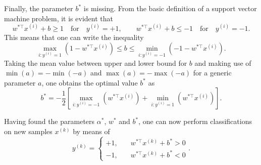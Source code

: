 \documentclass[a4paper,11pt]{article}
\numberwithin{equation}{section}
\begin{document}
{\begin{equation}
\end{equation} Finally, the parameter $b^*$ is missing. From the basic definition of a support vector machine problem, it is evident that \begin{equation}
w^{*\top}x^{(i)} + b \geq 1 \quad \text{for} \quad y^{(i)} = +1, \qquad w^{*\top}x^{(i)} + b \leq -1 \quad \text{for} \quad y^{(i)} = -1.
\end{equation} This means that one can write the inequality \begin{equation}
\max_{i:y^{(i)}=1}\left(1-w^{*\top}x^{(i)}\right) \leq b \leq \min_{i:y^{(i)}=-1}\left(-1-w^{*\top}x^{(i)}\right).
\end{equation} Taking the mean value between upper and lower bound for $b$ and making use of $\min(a) = -\min(-a)$ and $\max(a) = -\max(-a)$ for a generic parameter $a$, one obtains the optimal value $b^*$ as \begin{equation}
b^* = -\frac{1}{2}\left[\max_{i:y^{(i)}=-1}\left(w^{*\top}x^{(i)}\right)+\min_{i:y^{(i)}=1}\left(w^{*\top}x^{(i)}\right)\right].
\end{equation}

Having found the parameters $\alpha^*$, $w^*$ and $b^*$, one can now perform classifications on new samples $x^{(k)}$ by means of \begin{equation}
	y^{(k)} = \begin{cases}
		+1, &\quad w^{*\top}x^{(k)} + b^* > 0 \\
		-1, &\quad w^{*\top}x^{(k)} + b^* < 0
	\end{cases}.
\end{equation}
}
\end{document}
